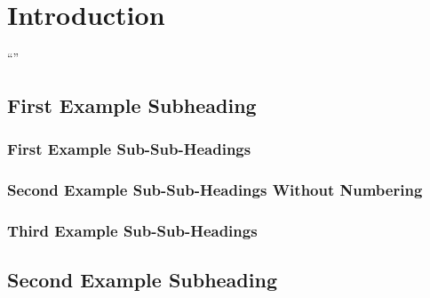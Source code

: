 \section{Introduction}

\enquote{\lipsum[1-1]}

\subsection{First Example Subheading}

\lipsum[1-4]

\subsubsection{First Example Sub-Sub-Headings}

\lipsum[1-1]

\subsubsection*{Second Example Sub-Sub-Headings Without Numbering}

\lipsum[1-1]

\subsubsection{Third Example Sub-Sub-Headings}

\lipsum[1-1]

\subsection{Second Example Subheading}

\lipsum[1-1]